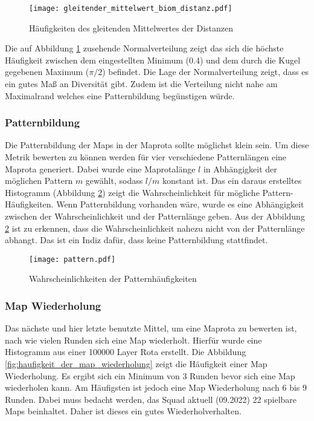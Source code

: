             \begin{figure}[htbp]
                \centering
                \texttt{[image: gleitender\_mittelwert\_biom\_distanz.pdf]}
                \caption{Häufigkeiten des gleitenden Mittelwertes der Distanzen}
                \label{fig:haufigkeit_gleitender_mittelwert}
            \end{figure}
            
            Die auf Abbildung \ref{fig:haufigkeit_gleitender_mittelwert} zusehende Normalverteilung zeigt das sich die höchste 
            Häufigkeit zwischen dem eingestellten Minimum (0.4) und dem durch die Kugel gegebenen Maximum ($\pi/2$) befindet.
            Die Lage der Normalverteilung zeigt, dass es ein gutes Maß an Diversität gibt. Zudem ist die
            Verteilung nicht nahe am Maximalrand welches eine Patternbildung begünstigen würde.


        \subsubsection{Patternbildung}
            Die Patternbildung der Maps in der Maprota sollte möglichst klein sein. Um diese Metrik bewerten zu können
            werden für vier verschiedene Patternlängen eine Maprota generiert. Dabei wurde eine Maprotalänge $l$ in Abhängigkeit
            der möglichen Pattern $m$ gewählt, sodass $l/m$ konstant ist. Das ein daraus erstelltes Histogramm (Abbildung \ref{fig:pattern}) 
            zeigt die Wahrscheinlichkeit für mögliche Pattern-Häufigkeiten. Wenn Patternbildung vorhanden wäre, wurde es eine Abhängigkeit zwischen 
            der Wahrscheinlichkeit und der Patternlänge geben.
            Aus der Abbildung \ref{fig:pattern} ist zu erkennen, dass die Wahrscheinlichkeit nahezu nicht von der Patternlänge abhangt. Das ist ein Indiz dafür,
            dass keine Patternbildung stattfindet.
            \begin{figure}[htbp]
                \centering
                \texttt{[image: pattern.pdf]}
                \caption{Wahrscheinlichkeiten der Patternhäufigkeiten}
                \label{fig:pattern}
            \end{figure}

        \subsubsection{Map Wiederholung}
            Das nächste und hier letzte benutzte Mittel, um eine Maprota zu bewerten ist, nach wie vielen Runden sich eine Map
            wiederholt. Hierfür wurde eine Histogramm aus einer 100000 Layer Rota erstellt.
            Die Abbildung \ref{fig:haufigkeit_der_map_wiederholung} zeigt die Häufigkeit einer Map Wiederholung. Es ergibt sich ein
            Minimum von 3 Runden bevor sich eine Map wiederholen kann. Am Häufigsten ist jedoch eine Map Wiederholung nach 6 bis 9 Runden.
            Dabei muss bedacht werden, das Squad aktuell (09.2022) 22 spielbare Maps beinhaltet. Daher ist dieses ein gutes Wiederholverhalten.

